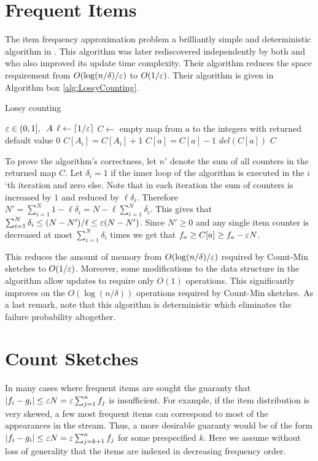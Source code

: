 \section{Frequent Items}

The item frequency approximation problem a brilliantly simple and deterministic algorithm in \cite{Misra1982}.
This algorithm was later rediscovered independently by both \cite{DemaineLopezAlejandroMunro2002} and \cite{Karp03asimple} who 
also improved its update time complexity.
Their algorithm reduces the space requirement from $O(\log(n/\delta)/\varepsilon)$ to $O(1/\varepsilon)$.
Their algorithm is given in Algorithm box \ref{alg:LossyCounting}.
%
\begin{algorithm} 
\caption{Lossy counting}
\label{alg:LossyCounting}
\begin{algorithmic}
 $\varepsilon \in (0,1], \;\;A$ 
\STATE $\ell \leftarrow \lceil 1/\varepsilon \rceil$
\STATE $C \leftarrow$ empty map from $a$ to the integers with returned default value $0$
	\STATE $C[A_i] = C[A_i] +1$
			\STATE $C[a] = C[a]-1$
				\STATE $del(C[a])$
			\ENDIF
		\ENDFOR
	\ENDIF
\ENDFOR
{} $C$ 
\end{algorithmic}
\end{algorithm}
%
To prove the algorithm's correctness, let $n'$ denote the sum of all counters in the returned map $C$.
Let $\delta_i = 1$ if the inner loop of the algorithm is executed in the $i$`th iteration and zero else. 
Note that in each iteration the sum of counters is increased by $1$ and reduced by $\ell \delta_i$. 
Therefore $N' = \sum_{i=1}^{N} 1 - \ell \delta_i = N - \ell \sum_{i=1}^{N}\delta_i$. 
This gives that $\sum_{i=1}^{N}\delta_i \le (N-N')/\ell \le \varepsilon (N-N')$. 
Since $N' \ge 0$ and any single item counter is decreased at most $\sum_{i=1}^{N}\delta_i$ times we get that $f_a \ge C[a] \ge f_a - \varepsilon N$.

This reduces the amount of memory from $O(\log(n/\delta)/\varepsilon)$ required by Count-Min sketches to $O(1/\varepsilon)$.
Moreover, some modifications to the data structure in the algorithm \cite{Karp03asimple} allow updates to require only $O(1)$ operations.
This significantly improves on the $O(\log(n/\delta))$ operations required by Count-Min sketches.
As a last remark, note that this algorithm is deterministic which eliminates the failure probability altogether.

\section{Count Sketches}
In many cases where frequent items are sought the guaranty that $|f_i - g_i| \le \varepsilon N = \varepsilon\sum_{j=1}^{n}f_j$ is insufficient.
For example, if the item distribution is very skewed, a few most frequent items can correspond to most of the appearances in the stream. 
Thus, a more desirable guaranty would be of the form $|f_i - g_i| \le \varepsilon N = \varepsilon\sum_{j=k+1}^{n}f_j$ for some prespecified $k$.
Here we assume without loss of generality that the items are indexed in decreasing frequency order.
  
